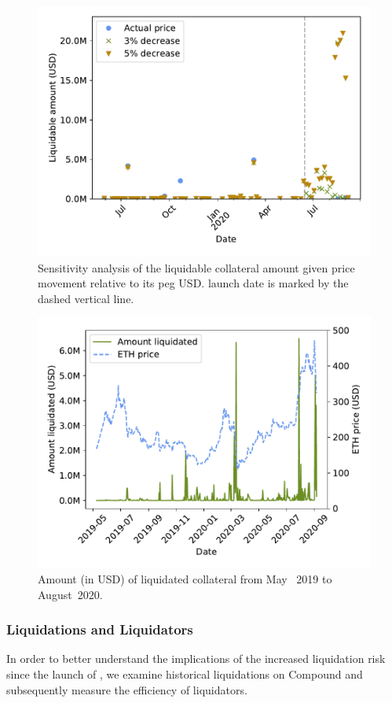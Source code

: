 \begin{figure}[tb]
  \centering
  \includegraphics[width=.7\textwidth]{./5b-economic-security/figures/dai-sensitivity.pdf}
  \caption{Sensitivity analysis of the liquidable collateral amount given  price movement relative to its peg USD.  launch date is marked by the dashed vertical line.}
  \label{fig:price-sensitivity}
\end{figure}

\begin{figure}[tb]
  \centering
  \includegraphics[width=.7\textwidth]{./5b-economic-security/figures/liquidation-over-time.pdf}
  \caption{Amount (in USD) of liquidated collateral from May ~2019 to August~2020.}
  \label{fig:liquidations-over-time}
\end{figure}

\subsubsection{Liquidations and Liquidators}
In order to better understand the implications of the increased liquidation risk since the launch of , we examine historical liquidations on Compound and subsequently measure the efficiency of liquidators.

